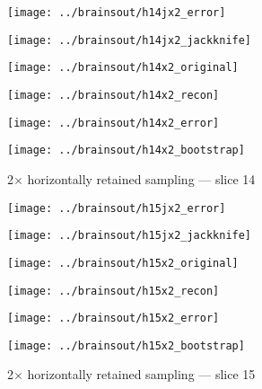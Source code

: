 \documentclass[review,supplement,onefignum,onetabnum,juq]{siamonline181217}
\begin{document}
\begin{figure}
\begin{centering}

\parbox{\imsize}{\texttt{[image: ../brainsout/h14jx2\_error]}}
\parbox{\imsize}{\texttt{[image: ../brainsout/h14jx2\_jackknife]}}

\vspace{\vertsep}

\parbox{\imsize}{\texttt{[image: ../brainsout/h14x2\_original]}}
\parbox{\imsize}{\texttt{[image: ../brainsout/h14x2\_recon]}}

\vspace{\vertsep}

\parbox{\imsize}{\texttt{[image: ../brainsout/h14x2\_error]}}
\parbox{\imsize}{\texttt{[image: ../brainsout/h14x2\_bootstrap]}}

\end{centering}
\caption{2$\times$ horizontally retained sampling --- slice 14}
\end{figure}


\begin{figure}
\begin{centering}

\parbox{\imsize}{\texttt{[image: ../brainsout/h15jx2\_error]}}
\parbox{\imsize}{\texttt{[image: ../brainsout/h15jx2\_jackknife]}}

\vspace{\vertsep}

\parbox{\imsize}{\texttt{[image: ../brainsout/h15x2\_original]}}
\parbox{\imsize}{\texttt{[image: ../brainsout/h15x2\_recon]}}

\vspace{\vertsep}

\parbox{\imsize}{\texttt{[image: ../brainsout/h15x2\_error]}}
\parbox{\imsize}{\texttt{[image: ../brainsout/h15x2\_bootstrap]}}

\end{centering}
\caption{2$\times$ horizontally retained sampling --- slice 15}
\end{figure}
\end{document}
